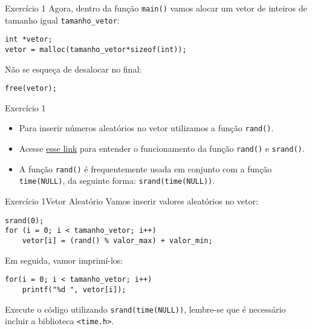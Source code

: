 \documentclass[aspectratio=169]{beamer}
\begin{document}

\begin{frame}[fragile]{Exercício 1}
Agora, dentro da função \verb|main()| vamos alocar um vetor de inteiros de tamanho igual \verb|tamanho_vetor|:
\begin{lstlisting}[style=CStyle]
int *vetor;
vetor = malloc(tamanho_vetor*sizeof(int));
\end{lstlisting}     
Não se esqueça de desalocar no final:
\begin{lstlisting}[style=CStyle]
free(vetor);
\end{lstlisting}     
\end{frame}


\begin{frame}[fragile]{Exercício 1}
\begin{itemize}
\item Para inserir números aleatórios no vetor utilizamos a função \verb|rand()|.
\item Acesse \href{http://linguagemc.com.br/valores-aleatorios-em-c-com-a-funcao-rand/}{\color{blue} esse link} para entender o funcionamento da função \verb|rand()| e \verb|srand()|.
\item A função \verb|rand()|  é frequentemente usada em conjunto com a função \verb|time(NULL)|, da seguinte forma: \verb|srand(time(NULL))|.
\end{itemize}
\end{frame}



\begin{frame}[fragile]{Exercício 1}{Vetor Aleatório}
Vamos inserir valores aleatórios no vetor:
\begin{lstlisting}[style=CStyle]
srand(0);
for (i = 0; i < tamanho_vetor; i++) 
    vetor[i] = (rand() % valor_max) + valor_min;

\end{lstlisting}  
Em seguida, vamor imprimí-los:
\begin{lstlisting}[style=CStyle]
for(i = 0; i < tamanho_vetor; i++)
    printf("%d ", vetor[i]);   
\end{lstlisting}  
Execute o código utilizando \verb|srand(time(NULL))|, lembre-se que é necessário incluir a biblioteca \verb|<time.h>|.
\end{frame}
\end{document}
